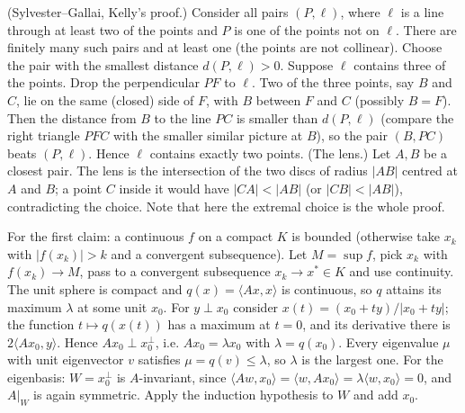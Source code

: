 \documentclass[11pt,a4paper]{article}
\begin{document}

 (Sylvester--Gallai, Kelly's proof.) Consider all pairs $(P,\ell)$, where $\ell$ is a line through at least two of the points and $P$ is one of the points not on $\ell$. There are finitely many such pairs and at least one (the points are not collinear). Choose the pair with the smallest distance $d(P,\ell)>0$.
 Suppose $\ell$ contains three of the points. Drop the perpendicular $PF$ to $\ell$. Two of the three points, say $B$ and $C$, lie on the same (closed) side of $F$, with $B$ between $F$ and $C$ (possibly $B=F$).
 Then the distance from $B$ to the line $PC$ is smaller than $d(P,\ell)$ (compare the right triangle $PFC$ with the smaller similar picture at $B$), so the pair $(B, PC)$ beats $(P,\ell)$. Hence $\ell$ contains exactly two points.
 (The lens.) Let $A,B$ be a closest pair. The lens is the intersection of the two discs of radius $|AB|$ centred at $A$ and $B$; a point $C$ inside it would have $|CA|<|AB|$ (or $|CB|<|AB|$), contradicting the choice. Note that here the extremal choice is the whole proof.

 For the first claim: a continuous $f$ on a compact $K$ is bounded (otherwise take $x_k$ with $|f(x_k)|>k$ and a convergent subsequence). Let $M=\sup f$, pick $x_k$ with $f(x_k)\to M$, pass to a convergent subsequence $x_k\to x^*\in K$ and use continuity.
 The unit sphere is compact and $q(x)=\langle Ax,x\rangle$ is continuous, so $q$ attains its maximum $\lambda$ at some unit $x_0$. For $y\perp x_0$ consider $x(t)=(x_0+ty)/|x_0+ty|$; the function $t\mapsto q(x(t))$ has a maximum at $t=0$, and its derivative there is $2\langle Ax_0,y\rangle$.
 Hence $Ax_0\perp x_0^{\perp}$, i.e. $Ax_0=\lambda x_0$ with $\lambda=q(x_0)$. Every eigenvalue $\mu$ with unit eigenvector $v$ satisfies $\mu=q(v)\le\lambda$, so $\lambda$ is the largest one.
 For the eigenbasis: $W=x_0^{\perp}$ is $A$-invariant, since $\langle Aw,x_0\rangle=\langle w,Ax_0\rangle=\lambda\langle w,x_0\rangle=0$, and $A|_W$ is again symmetric. Apply the induction hypothesis to $W$ and add $x_0$.
\end{document}

